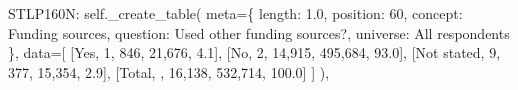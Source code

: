 \documentclass[
  11pt,
  a4paper,
]{article}
\newenvironment{Shaded}{\begin{snugshade}}{\end{snugshade}}
\newcommand{\NormalTok}[1]{\textcolor[rgb]{0.00,0.23,0.31}{#1}}
\newcommand{\OperatorTok}[1]{\textcolor[rgb]{0.37,0.37,0.37}{#1}}
\newcommand{\StringTok}[1]{\textcolor[rgb]{0.13,0.47,0.30}{#1}}
\newcommand{\VariableTok}[1]{\textcolor[rgb]{0.07,0.07,0.07}{#1}}
\begin{document}
\begin{Shaded}
\begin{Highlighting}[]
            \StringTok{\textquotesingle{}STLP160N\textquotesingle{}}\NormalTok{: }\VariableTok{self}\NormalTok{.\_create\_table(}
\NormalTok{                meta}\OperatorTok{=}\NormalTok{\{}
                    \StringTok{\textquotesingle{}length\textquotesingle{}}\NormalTok{: }\StringTok{\textquotesingle{}1.0\textquotesingle{}}\NormalTok{, }\StringTok{\textquotesingle{}position\textquotesingle{}}\NormalTok{: }\StringTok{\textquotesingle{}60\textquotesingle{}}\NormalTok{,}
                    \StringTok{\textquotesingle{}concept\textquotesingle{}}\NormalTok{: }\StringTok{\textquotesingle{}Funding sources\textquotesingle{}}\NormalTok{,}
                    \StringTok{\textquotesingle{}question\textquotesingle{}}\NormalTok{: }\StringTok{\textquotesingle{}Used other funding sources?\textquotesingle{}}\NormalTok{,}
                    \StringTok{\textquotesingle{}universe\textquotesingle{}}\NormalTok{: }\StringTok{\textquotesingle{}All respondents\textquotesingle{}}
\NormalTok{                \},}
\NormalTok{                data}\OperatorTok{=}\NormalTok{[}
\NormalTok{                    [}\StringTok{\textquotesingle{}Yes\textquotesingle{}}\NormalTok{, }\StringTok{\textquotesingle{}1\textquotesingle{}}\NormalTok{, }\StringTok{\textquotesingle{}846\textquotesingle{}}\NormalTok{, }\StringTok{\textquotesingle{}21,676\textquotesingle{}}\NormalTok{, }\StringTok{\textquotesingle{}4.1\textquotesingle{}}\NormalTok{],}
\NormalTok{                    [}\StringTok{\textquotesingle{}No\textquotesingle{}}\NormalTok{, }\StringTok{\textquotesingle{}2\textquotesingle{}}\NormalTok{, }\StringTok{\textquotesingle{}14,915\textquotesingle{}}\NormalTok{, }\StringTok{\textquotesingle{}495,684\textquotesingle{}}\NormalTok{, }\StringTok{\textquotesingle{}93.0\textquotesingle{}}\NormalTok{],}
\NormalTok{                    [}\StringTok{\textquotesingle{}Not stated\textquotesingle{}}\NormalTok{, }\StringTok{\textquotesingle{}9\textquotesingle{}}\NormalTok{, }\StringTok{\textquotesingle{}377\textquotesingle{}}\NormalTok{, }\StringTok{\textquotesingle{}15,354\textquotesingle{}}\NormalTok{, }\StringTok{\textquotesingle{}2.9\textquotesingle{}}\NormalTok{],}
\NormalTok{                    [}\StringTok{\textquotesingle{}Total\textquotesingle{}}\NormalTok{, }\StringTok{\textquotesingle{}\textquotesingle{}}\NormalTok{, }\StringTok{\textquotesingle{}16,138\textquotesingle{}}\NormalTok{, }\StringTok{\textquotesingle{}532,714\textquotesingle{}}\NormalTok{, }\StringTok{\textquotesingle{}100.0\textquotesingle{}}\NormalTok{]}
\NormalTok{                ]}
\NormalTok{            ),}
            

\end{Highlighting}
\end{Shaded}
\end{document}
